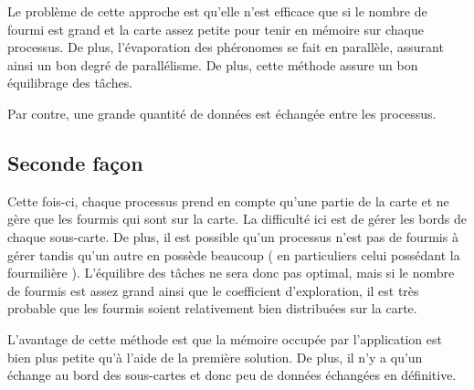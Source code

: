 \documentclass[a4]{article}
\begin{document}
Le problème de cette approche est qu'elle n'est efficace que si le nombre de fourmi est grand et la carte assez petite pour tenir en mémoire sur chaque processus. De plus, l'évaporation des phéronomes se fait en parallèle, assurant ainsi un bon degré de parallélisme. De plus, cette méthode assure un bon équilibrage des tâches.

Par contre, une grande quantité de données est échangée entre les processus.

\subsection{Seconde façon}

Cette fois-ci, chaque processus prend en compte qu'une partie de la carte et ne gère que les fourmis qui sont sur la carte. La difficulté ici est de gérer les bords de chaque sous-carte. De plus, il est possible qu'un processus n'est pas de fourmis à gérer tandis qu'un autre en possède beaucoup ( en particuliers celui possédant la fourmilière ). L'équilibre des tâches ne sera donc pas optimal, mais si le nombre de fourmis est assez grand ainsi que le coefficient d'exploration, il est très probable que les fourmis soient relativement bien distribuées sur la carte.

L'avantage de cette méthode est que la mémoire occupée par l'application est bien plus petite qu'à l'aide de la première solution. De plus,
il n'y a qu'un échange au bord des sous-cartes et donc peu de données échangées en définitive.
\end{document}
